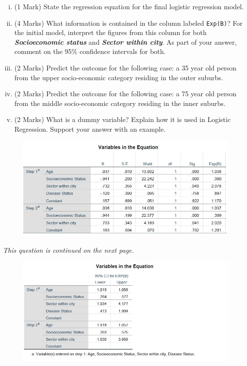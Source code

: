 \documentclass[a4paper,12pt]{article}
\begin{document}
\begin{enumerate}
\begin{enumerate}[(a)]
\begin{enumerate}[(i)]
\item (1 Mark) State the regression equation for the final logistic regression model.
\item (4 Marks) What information is contained in the column labeled \texttt{Exp(B)}? For the initial model, interpret the figures from this column for both \textbf{\textit{Socioeconomic status}} and \textbf{\textit{Sector within city}}. 
As part of your answer, comment on the 95\% confidence intervals for both.


\item (2 Marks) Predict the outcome for the following case: a 35 year old person from the upper socio-economic category residing in the outer suburbs.
\item (2 Marks) Predict the outcome for the following case: a 75 year old person  from the middle socio-economic category residing in the inner suburbs.

\item (2 Marks)
What is a dummy variable? Explain how it is used in Logistic Regression. Support your answer with an example.
\end{enumerate}

\begin{figure}[h!]
	\centering

\includegraphics[width=1.00\linewidth]{BLR-A}\\

\end{figure}

\noindent \textit{This question is continued on the next page.}
\begin{figure}[h!]
	\centering

	\includegraphics[width=1.00\linewidth]{BLR-B}\\
	

\end{figure}
\end{enumerate}
\end{enumerate}
\end{document}
